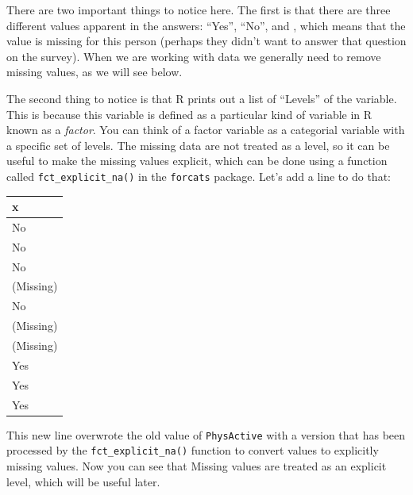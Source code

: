 \documentclass[12pt,]{book}
\newenvironment{Shaded}{\begin{snugshade}}{\end{snugshade}}
\newcommand{\CommentTok}[1]{\textcolor[rgb]{0.56,0.35,0.01}{\textit{#1}}}
\newcommand{\DataTypeTok}[1]{\textcolor[rgb]{0.13,0.29,0.53}{#1}}
\newcommand{\DecValTok}[1]{\textcolor[rgb]{0.00,0.00,0.81}{#1}}
\newcommand{\KeywordTok}[1]{\textcolor[rgb]{0.13,0.29,0.53}{\textbf{#1}}}
\newcommand{\NormalTok}[1]{#1}
\newcommand{\OperatorTok}[1]{\textcolor[rgb]{0.81,0.36,0.00}{\textbf{#1}}}
\newcommand{\StringTok}[1]{\textcolor[rgb]{0.31,0.60,0.02}{#1}}
\begin{document}
There are two important things to notice here. The first is that there are three different values apparent in the answers: ``Yes'', ``No'', and , which means that the value is missing for this person (perhaps they didn't want to answer that question on the survey). When we are working with data we generally need to remove missing values, as we will see below.

The second thing to notice is that R prints out a list of ``Levels'' of the variable. This is because this variable is defined as a particular kind of variable in R known as a \emph{factor}. You can think of a factor variable as a categorial variable with a specific set of levels. The missing data are not treated as a level, so it can be useful to make the missing values explicit, which can be done using a function called \texttt{fct\_explicit\_na()} in the \texttt{forcats} package. Let's add a line to do that:

\begin{Shaded}
\end{Shaded}

\begin{tabular}{l}
\hline
x\\
\hline
No\\
\hline
No\\
\hline
No\\
\hline
(Missing)\\
\hline
No\\
\hline
(Missing)\\
\hline
(Missing)\\
\hline
Yes\\
\hline
Yes\\
\hline
Yes\\
\hline
\end{tabular}

This new line overwrote the old value of \texttt{PhysActive} with a version that has been processed by the \texttt{fct\_explicit\_na()} function to convert values to explicitly missing values. Now you can see that Missing values are treated as an explicit level, which will be useful later.
\end{document}

